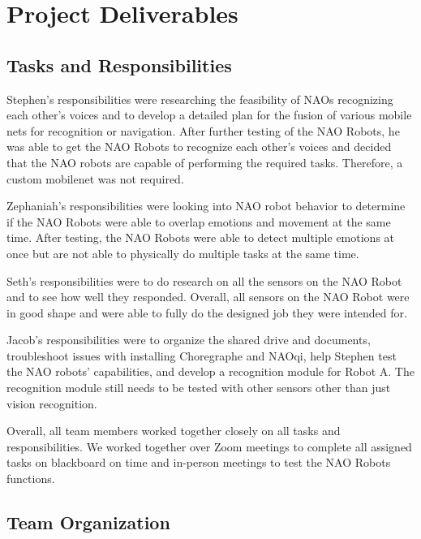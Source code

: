 \chapter{Project Deliverables}
\label{ch:projectdeliverables}
\section{Tasks and Responsibilities}
Stephen’s responsibilities were researching the feasibility of NAOs recognizing each other’s voices and to develop a detailed plan for the fusion of various mobile nets for recognition or navigation. After further testing of the NAO Robots, he was able to get the NAO Robots to recognize each other's voices and decided that the NAO robots are capable of performing the required tasks. Therefore, a custom mobilenet was not required. \par 

Zephaniah’s responsibilities were looking into NAO robot behavior to determine if the NAO Robots were able to overlap emotions and movement at the same time. After testing, the NAO Robots were able to detect multiple emotions at once but are not able to physically do multiple tasks at the same time. \par 

Seth’s responsibilities were to do research on all the sensors on the NAO Robot and to see how well they responded. Overall, all sensors on the NAO Robot were in good shape and were able to fully do the designed job they were intended for. \par 

Jacob’s responsibilities were to organize the shared drive and documents, troubleshoot issues with installing Choregraphe and NAOqi, help Stephen test the NAO robots’ capabilities, and develop a recognition module for Robot A. The recognition module still needs to be tested with other sensors other than just vision recognition. \par 

Overall, all team members worked together closely on all tasks and responsibilities. We worked together over Zoom meetings to complete all assigned tasks on blackboard on time and in-person meetings to test the NAO Robots functions.\par 


\section{Team Organization}

